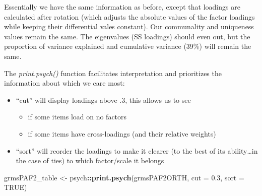 \documentclass[
  english,
]{book}
\newenvironment{Shaded}{\begin{snugshade}}{\end{snugshade}}
\newcommand{\DataTypeTok}[1]{\textcolor[rgb]{0.13,0.29,0.53}{#1}}
\newcommand{\FloatTok}[1]{\textcolor[rgb]{0.00,0.00,0.81}{#1}}
\newcommand{\KeywordTok}[1]{\textcolor[rgb]{0.13,0.29,0.53}{\textbf{#1}}}
\newcommand{\NormalTok}[1]{#1}
\newcommand{\OperatorTok}[1]{\textcolor[rgb]{0.81,0.36,0.00}{\textbf{#1}}}
\newcommand{\OtherTok}[1]{\textcolor[rgb]{0.56,0.35,0.01}{#1}}
\newcommand{\StringTok}[1]{\textcolor[rgb]{0.31,0.60,0.02}{#1}}
\providecommand{\tightlist}{%
  \setlength{\itemsep}{0pt}\setlength{\parskip}{0pt}}
\begin{document}
Essentially we have the same information as before, except that loadings are calculated after rotation (which adjusts the absolute values of the factor loadings while keeping their differential vales constant). Our communality and uniqueness values remain the same. The eigenvalues (SS loadings) should even out, but the proportion of variance explained and cumulative variance (39\%) will remain the same.

The \emph{print.psych()} function facilitates interpretation and prioritizes the information about which we care most:

\begin{itemize}
\tightlist
\item
  ``cut'' will display loadings above .3, this allows us to see

  \begin{itemize}
  \tightlist
  \item
    if some items load on no factors
  \item
    if some items have cross-loadings (and their relative weights)
  \end{itemize}
\item
  ``sort'' will reorder the loadings to make it clearer (to the best of its ability\ldots in the case of ties) to which factor/scale it belongs
\end{itemize}

\begin{Shaded}
\begin{Highlighting}[]
\NormalTok{grmsPAF2_table <-}\StringTok{ }\NormalTok{psych}\OperatorTok{::}\KeywordTok{print.psych}\NormalTok{(grmsPAF2ORTH, }\DataTypeTok{cut =} \FloatTok{0.3}\NormalTok{, }\DataTypeTok{sort =} \OtherTok{TRUE}\NormalTok{)}
\end{Highlighting}
\end{Shaded}
\end{document}
